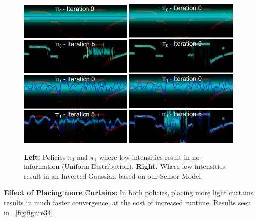  \begin{figure}[h]
    \centering
    \begin{minipage}{0.5\textwidth}
        \centering
        \includegraphics[width=0.49\textwidth]{figures/InvGau.png}
        \includegraphics[width=0.49\textwidth]{figures/Uniform.png}
    \end{minipage}\hfill
    \centering
    \caption{\textbf{Left:} Policies $\pi_{0}$ and $\pi_{1}$ where low intensities result in no information (Uniform Distribution). \textbf{Right:} Where low intensities result in an Inverted Gaussian based on our Sensor Model}
    \label{fig:invgau} 
\end{figure}

 \textbf{Effect of Placing more Curtains:} In both policies, placing more light curtains results in much faster convergence, at the cost of increased runtime. Results seen in ~\ref{fig:figure34}

